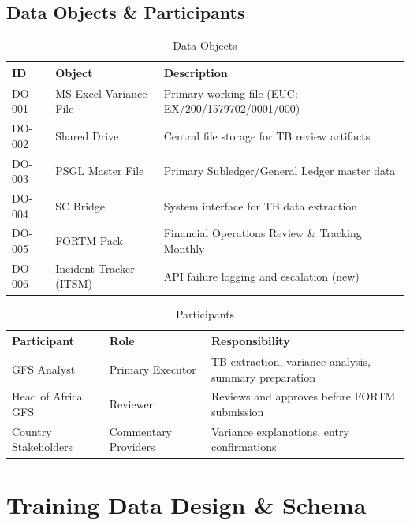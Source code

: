 \documentclass[11pt,a4paper]{article}
\begin{document}
\subsection{Data Objects \& Participants}

\begin{table}[h]
\centering
\caption{Data Objects}
\begin{tabular}{@{}C{1.5cm}L{4cm}L{8.5cm}@{}}
\toprule
\textbf{ID} & \textbf{Object} & \textbf{Description} \\
\midrule
DO-001 & MS Excel Variance File & Primary working file (EUC: EX/200/1579702/0001/000) \\
DO-002 & Shared Drive & Central file storage for TB review artifacts \\
DO-003 & PSGL Master File & Primary Subledger/General Ledger master data \\
DO-004 & SC Bridge & System interface for TB data extraction \\
DO-005 & FORTM Pack & Financial Operations Review \& Tracking Monthly \\
DO-006 & Incident Tracker (ITSM) & API failure logging and escalation (new) \\
\bottomrule
\end{tabular}
\end{table}

\begin{table}[h]
\centering
\caption{Participants}
\begin{tabular}{@{}L{4cm}L{3.5cm}L{6.5cm}@{}}
\toprule
\textbf{Participant} & \textbf{Role} & \textbf{Responsibility} \\
\midrule
GFS Analyst & Primary Executor & TB extraction, variance analysis, summary preparation \\
Head of Africa GFS & Reviewer & Reviews and approves before FORTM submission \\
Country Stakeholders & Commentary Providers & Variance explanations, entry confirmations \\
\bottomrule
\end{tabular}
\end{table}


\newpage
\section{Training Data Design \& Schema}
\end{document}
